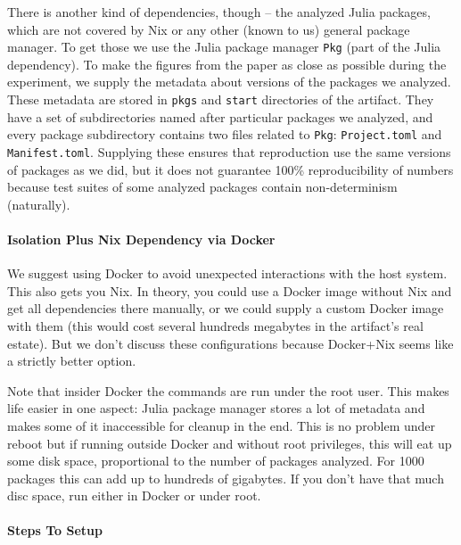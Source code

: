 \documentclass[
]{article}
\begin{document}
There is another kind of dependencies, though -- the analyzed Julia
packages, which are not covered by Nix or any other (known to us)
general package manager. To get those we use the Julia package manager
\texttt{Pkg} (part of the Julia dependency). To make the figures from
the paper as close as possible during the experiment, we supply the
metadata about versions of the packages we analyzed. These metadata are
stored in \texttt{pkgs} and \texttt{start} directories of the artifact.
They have a set of subdirectories named after particular packages we
analyzed, and every package subdirectory contains two files related to
\texttt{Pkg}: \texttt{Project.toml} and \texttt{Manifest.toml}.
Supplying these ensures that reproduction use the same versions of
packages as we did, but it does not guarantee 100\% reproducibility of
numbers because test suites of some analyzed packages contain
non-determinism (naturally).

\hypertarget{isolation-plus-nix-dependency-via-docker}{%
\paragraph{Isolation Plus Nix Dependency via
Docker}\label{isolation-plus-nix-dependency-via-docker}}

We suggest using Docker to avoid unexpected interactions with the host
system. This also gets you Nix. In theory, you could use a Docker image
without Nix and get all dependencies there manually, or we could supply
a custom Docker image with them (this would cost several hundreds
megabytes in the artifact's real estate). But we don't discuss these
configurations because Docker+Nix seems like a strictly better option.

Note that insider Docker the commands are run under the root user. This
makes life easier in one aspect: Julia package manager stores a lot of
metadata and makes some of it inaccessible for cleanup in the end. This
is no problem under reboot but if running outside Docker and without root
privileges, this will eat up some disk space, proportional to the number
of packages analyzed. For 1000 packages this can add up to hundreds of
gigabytes. If you don't have that much disc space, run either in Docker
or under root.

\hypertarget{steps-to-setup}{%
\paragraph{Steps To Setup}\label{steps-to-setup}}
\end{document}
